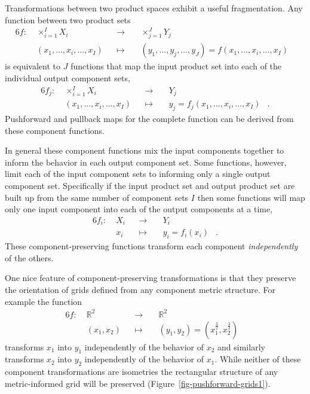 \documentclass[
  letterpaper,
  DIV=11,
  numbers=noendperiod]{scrartcl}
\begin{document}
Transformations between two product spaces exhibit a useful
fragmentation. Any function between two product sets \begin{alignat*}{6}
f :\; & \times_{i = 1}^{I} X_{i} & &\rightarrow& \; & \times_{j = 1}^{J} Y_{j} &
\\
& (x_{1}, \ldots, x_{i}, \ldots, x_{I}) & &\mapsto&
& (y_{1}, \ldots, y_{j}, \ldots, y_{J}) = f(x_{1}, \ldots, x_{i}, \ldots, x_{I}) &
\end{alignat*} is equivalent to \(J\) functions that map the input
product set into each of the individual output component sets,
\begin{alignat*}{6}
f_{j} :\; & \times_{i = 1}^{I} X_{i} & &\rightarrow& \; & Y_{j} &
\\
& (x_{1}, \ldots, x_{i}, \ldots, x_{I}) & &\mapsto&
& y_{j} = f_{j}(x_{1}, \ldots, x_{i}, \ldots, x_{I}) &.
\end{alignat*} Pushforward and pullback maps for the complete function
can be derived from these component functions.

In general these component functions mix the input components together
to inform the behavior in each output component set. Some functions,
however, limit each of the input component sets to informing only a
single output component set. Specifically if the input product set and
output product set are built up from the same number of component sets
\(I\) then some functions will map only one input component into each of
the output components at a time, \begin{alignat*}{6}
f_{i} :\; & X_{i} & &\rightarrow& \; & Y_{i} &
\\
& x_{i} & &\mapsto& & y_{i} = f_{i}(x_{i}) &.
\end{alignat*} These component-preserving functions transform each
component \emph{independently} of the others.

One nice feature of component-preserving transformations is that they
preserve the orientation of grids defined from any component metric
structure. For example the function \begin{alignat*}{6}
f :\; & \mathbb{R}^{2} & &\rightarrow& \; & \mathbb{R}^{2} &
\\
& (x_{1}, x_{2}) & &\mapsto& &
(y_{1}, y_{2}) = (x_{1}^{\frac{3}{2}}, x_{2}^{\frac{3}{2}}) &
\end{alignat*} transforms \(x_{1}\) into \(y_{1}\) independently of the
behavior of \(x_{2}\) and similarly transforms \(x_{2}\) into \(y_{2}\)
independently of the behavior of \(x_{1}\). While neither of these
component transformations are isometries the rectangular structure of
any metric-informed grid will be preserved
(Figure~\ref{fig-pushforward-grids1}).
\end{document}
